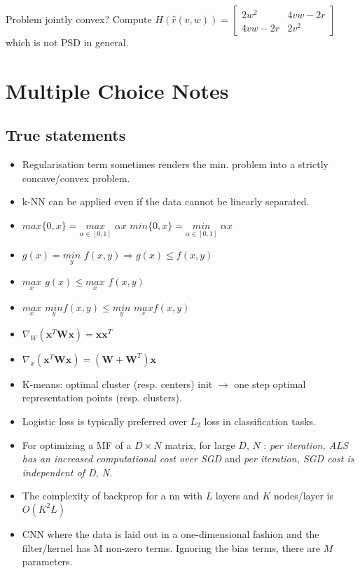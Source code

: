 Problem jointly convex? Compute $H(\hat{r}({v,w})) = \begin{bmatrix} 2w^2 & 4vw-2r \\ 4vw-2r & 2v^2 \end{bmatrix}$ which is not PSD in general.


\section{Multiple Choice Notes}
\subsection{True statements}
\begin{itemize}
\item Regularisation term sometimes renders the min. problem into a strictly concave/convex problem.
\item k-NN can be applied even if the data cannot be linearly separated.
\item $max\{ 0, x\} = \underset{{\alpha \in [0,1]}}{max} \,\, \alpha x$ \newline $min\{ 0, x\} = \underset{{\alpha \in [0,1]}}{min}\,\,  \alpha x$
\item $g(x) = \underset{y}{min}\,\, f(x,y) \Rightarrow g(x) \le f(x,y)$
\item $\underset{x}{max}\,\, g(x) \le \underset{x}{max} \,\,f(x,y)$ \newline
\item $\underset{x}{max} \,\, \underset{y}{min}  f(x,y) \le \underset{y}{min} \,\, \underset{x}{max} f(x,y)$
\item $\nabla_{W} (\mathbf{x}^T\mathbf{W}\mathbf{x}) = \mathbf{x}\mathbf{x}^T$
\item $\nabla_{x} (\mathbf{x}^T\mathbf{W}\mathbf{x}) = (\mathbf{W}+\mathbf{W}^T)\mathbf{x}$
\item K-means: optimal cluster (resp. centers) init $\rightarrow$ one step optimal representation points (resp. clusters).
\item Logistic loss is typically preferred over $L_2$ loss in classification tasks.
\item For optimizing a MF of a $D\times N$ matrix, for large $D$, $N$ : \textit{per iteration, ALS has an increased computational cost over SGD} and \textit{per iteration, SGD cost is independent of D, N}.
\item The complexity of backprop for a nn with $L$ layers and $K$ nodes/layer is $O(K^2L)$
\item CNN where the data is laid out in a one-dimensional fashion and the filter/kernel has M non-zero terms. Ignoring the bias terms, there are $M$ parameters.
\end{itemize}

